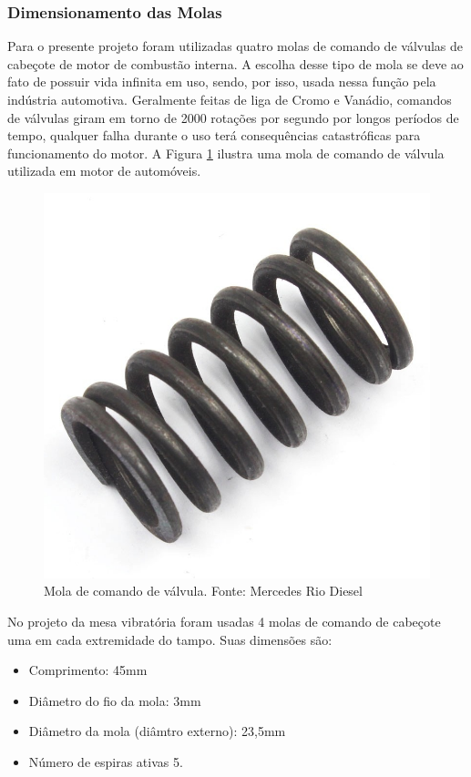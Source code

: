 \subsubsection*{\textbf{Dimensionamento das Molas}}

Para o presente projeto foram utilizadas quatro molas de comando de válvulas de cabeçote de motor de combustão interna. A escolha desse tipo de mola se deve ao fato de possuir 
vida infinita em uso, sendo, por isso, usada nessa função pela indústria automotiva. Geralmente feitas de liga de Cromo 
e Vanádio, comandos de válvulas giram em torno de 2000 rotações por segundo por longos períodos de tempo, 
qualquer falha durante o uso terá consequências catastróficas para funcionamento do motor. A  Figura \ref{fig:mola} 
ilustra uma mola de comando de válvula utilizada em motor de automóveis.

\begin{figure}[H]
\centering
\includegraphics[scale=0.3]{figuras/mola.png}
\caption{Mola de comando de válvula. Fonte: Mercedes Rio Diesel}
\label{fig:mola}
\end{figure}

No projeto da mesa vibratória foram usadas 4 molas de comando de cabeçote uma em cada extremidade do tampo. Suas dimensões são:
\begin{itemize}
\item Comprimento: 45mm
\item Diâmetro do fio da mola: 3mm
\item Diâmetro da mola (diâmtro externo): 23,5mm
\item Número de espiras ativas 5.
\end{itemize}

